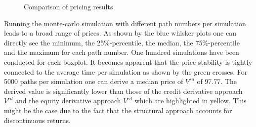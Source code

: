 \begin{figure}[H]
\caption[Comparison of pricing results]{Comparison of pricing results}
\label{fig:comparison}
\end{figure}

Running the monte-carlo simulation with different path numbers per simulation leads to a broad range of prices. As shown by the blue whisker plots one can directly see the minimum, the 25\%-percentile, the median, the 75\%-percentile and the maximum for each path number. One hundred simulations have been conducted for each boxplot. It becomes apparent that the price stability is tightly connected to the average time per simulation as shown by the green crosses. For 5000 paths per simulation one can derive a median price of $V^{sa}$ of $97.77$. The derived value is significantly lower than those of the credit derivative approach $V^{cd}$ and the equity derivative approach $V^{ed}$ which are highlighted in yellow. This might be the case due to the fact that the structural approach accounts for discontinuous returns.


